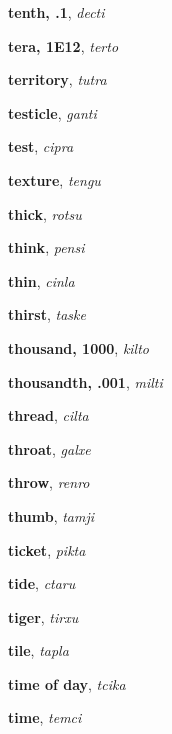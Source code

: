\documentclass[12pt]{book}
\begin{document}
\begin{description}
\item[ ] \textbf{tenth, .1}, \textit{decti}

\item[ ] \textbf{tera, 1E12}, \textit{terto}

\item[ ] \textbf{territory}, \textit{tutra}

\item[ ] \textbf{testicle}, \textit{ganti}

\item[ ] \textbf{test}, \textit{cipra}

\item[ ] \textbf{texture}, \textit{tengu}

\item[ ] \textbf{thick}, \textit{rotsu}

\item[ ] \textbf{think}, \textit{pensi}

\item[ ] \textbf{thin}, \textit{cinla}

\item[ ] \textbf{thirst}, \textit{taske}

\item[ ] \textbf{thousand, 1000}, \textit{kilto}

\item[ ] \textbf{thousandth, .001}, \textit{milti}

\item[ ] \textbf{thread}, \textit{cilta}

\item[ ] \textbf{throat}, \textit{galxe}

\item[ ] \textbf{throw}, \textit{renro}

\item[ ] \textbf{thumb}, \textit{tamji}

\item[ ] \textbf{ticket}, \textit{pikta}

\item[ ] \textbf{tide}, \textit{ctaru}

\item[ ] \textbf{tiger}, \textit{tirxu}

\item[ ] \textbf{tile}, \textit{tapla}

\item[ ] \textbf{time of day}, \textit{tcika}

\item[ ] \textbf{time}, \textit{temci}


\end{description}
\end{document}
